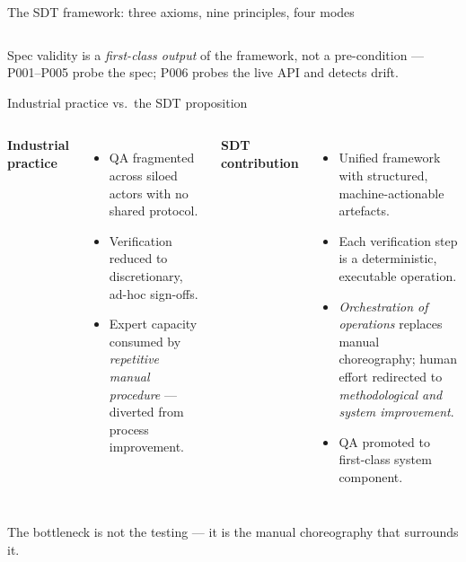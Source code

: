 \documentclass[11pt,aspectratio=169]{beamer}
\begin{document}
\begin{frame}{The SDT framework: three axioms, nine principles, four modes}
\begin{columns}[T,onlytextwidth]
\end{columns}

\vspace{0.6em}
\begin{center}
\footnotesize
\alert{Spec validity is a \emph{first-class output} of the framework, not a pre-condition} ---
P001--P005 probe the spec; P006 probes the live API and detects drift.
\end{center}

\end{frame}

\begin{frame}{Industrial practice vs.\ the SDT proposition}

\begin{columns}[T,onlytextwidth]

\textbf{\textcolor{sdtred}{Industrial practice}}\\[0.4em]
\footnotesize
\begin{itemize}\setlength\itemsep{0.25em}
\item QA fragmented across siloed actors with no shared protocol.
\item Verification reduced to discretionary, ad-hoc sign-offs.
\item Expert capacity consumed by \emph{repetitive manual procedure} ---
  diverted from process improvement.
\end{itemize}

\textbf{\textcolor{sdtgreen}{SDT contribution}}\\[0.4em]
\footnotesize
\begin{itemize}\setlength\itemsep{0.25em}
\item Unified framework with structured, machine-actionable artefacts.
\item Each verification step is a deterministic, executable operation.
\item \emph{Orchestration of operations} replaces manual choreography;
  human effort redirected to \emph{methodological and system improvement}.
\item QA promoted to \alert{first-class system component}.
\end{itemize}

\end{columns}

\vspace{0.8em}
\begin{center}
\alert{The bottleneck is not the testing --- it is the manual
choreography that surrounds it.}
\end{center}

\end{frame}
\end{document}
